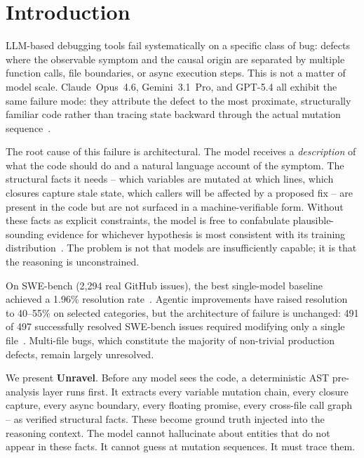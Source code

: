 \documentclass[12pt,a4paper]{article}
\begin{document}
\section{Introduction}

LLM-based debugging tools fail systematically on a specific class of bug: defects where
the observable symptom and the causal origin are separated by multiple function calls,
file boundaries, or async execution steps. This is not a matter of model scale.
Claude~Opus~4.6, Gemini~3.1~Pro, and GPT-5.4 all exhibit the same failure mode: they
attribute the defect to the most proximate, structurally familiar code rather than tracing
state backward through the actual mutation sequence~\cite{arora2026, debuggingdecay2026}.

The root cause of this failure is architectural. The model receives a \textit{description}
of what the code should do and a natural language account of the symptom. The structural
facts it needs -- which variables are mutated at which lines, which closures capture stale
state, which callers will be affected by a proposed fix -- are present in the code but are
not surfaced in a machine-verifiable form. Without these facts as explicit constraints, the
model is free to confabulate plausible-sounding evidence for whichever hypothesis is most
consistent with its training distribution~\cite{liu2023}. The problem is not that models
are insufficiently capable; it is that the reasoning is unconstrained.

On SWE-bench (2,294 real GitHub issues), the best single-model baseline achieved a 1.96\%
resolution rate~\cite{jimenez2024}. Agentic improvements have raised resolution to 40--55\%
on selected categories, but the architecture of failure is unchanged: 491 of 497
successfully resolved SWE-bench issues required modifying only a single
file~\cite{swebench2509}. Multi-file bugs, which constitute the majority of
non-trivial production defects, remain largely unresolved.

We present \textbf{Unravel}. Before any model sees the code, a deterministic AST
pre-analysis layer runs first. It extracts every variable mutation chain, every closure
capture, every async boundary, every floating promise, every cross-file call graph -- as
verified structural facts. These become ground truth injected into the reasoning context.
The model cannot hallucinate about entities that do not appear in these facts. It cannot
guess at mutation sequences. It must trace them.
\end{document}
